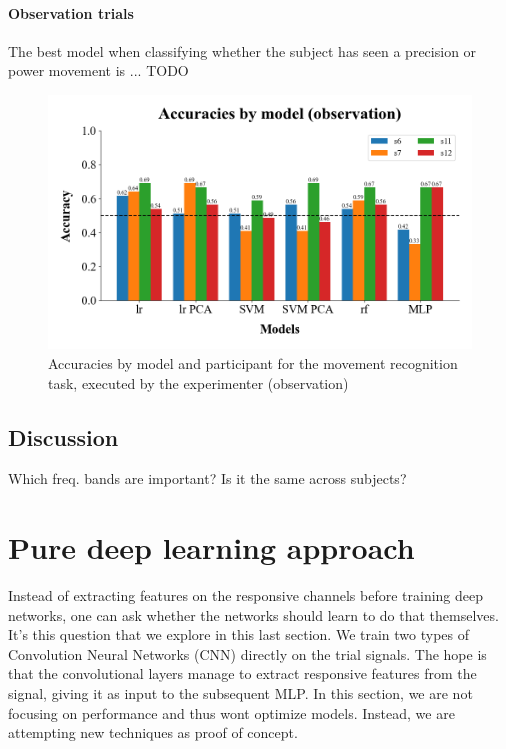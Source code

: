 \documentclass[10pt,conference,compsocconf]{IEEEtran}
\begin{document}
\paragraph{Observation trials}
The best model when classifying whether the subject has seen a precision or power movement is ... TODO

\begin{figure}[h!]
  \center
  \includegraphics[width=\linewidth]{../figures/accuracies_across_part_obs.png}
  \caption{Accuracies by model and participant for the movement recognition task, executed by the experimenter (observation)}
\end{figure}
\FloatBarrier

\subsection{Discussion}
Which freq. bands are important? Is it the same across subjects?

\section{Pure deep learning approach}
\label{sec:deeplearning}
Instead of extracting features on the responsive channels before training deep networks, one can ask whether the networks should learn to do that themselves. It's this question that we explore in this last section. We train two types of Convolution Neural Networks (CNN) directly on the trial signals. The hope is that the convolutional layers manage to extract responsive features from the signal, giving it as input to the subsequent MLP. In this section, we are not focusing on performance and thus wont optimize models. Instead, we are attempting new techniques as proof of concept.
\end{document}
